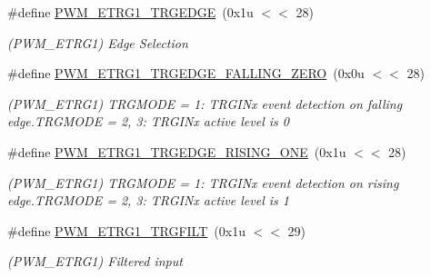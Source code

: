 \begin{DoxyCompactItemize}
\mbox{\label{group__SAME70__PWM_gaaf0120437d89414d59690742b3efa100}} 
\#define \mbox{\hyperlink{group__SAME70__PWM_gaaf0120437d89414d59690742b3efa100}{P\+W\+M\+\_\+\+E\+T\+R\+G1\+\_\+\+T\+R\+G\+E\+D\+GE}}~(0x1u $<$$<$ 28)
\begin{DoxyCompactList}\small\item\em (P\+W\+M\+\_\+\+E\+T\+R\+G1) Edge Selection \end{DoxyCompactList}\item 
\mbox{\label{group__SAME70__PWM_gac266df7e4f0b79f5bcb40bb827b592fb}} 
\#define \mbox{\hyperlink{group__SAME70__PWM_gac266df7e4f0b79f5bcb40bb827b592fb}{P\+W\+M\+\_\+\+E\+T\+R\+G1\+\_\+\+T\+R\+G\+E\+D\+G\+E\+\_\+\+F\+A\+L\+L\+I\+N\+G\+\_\+\+Z\+E\+RO}}~(0x0u $<$$<$ 28)
\begin{DoxyCompactList}\small\item\em (P\+W\+M\+\_\+\+E\+T\+R\+G1) T\+R\+G\+M\+O\+DE = 1\+: T\+R\+G\+I\+Nx event detection on falling edge.\+T\+R\+G\+M\+O\+DE = 2, 3\+: T\+R\+G\+I\+Nx active level is 0 \end{DoxyCompactList}\item 
\mbox{\label{group__SAME70__PWM_ga6b672d5ab66c44eda17f0224b2117447}} 
\#define \mbox{\hyperlink{group__SAME70__PWM_ga6b672d5ab66c44eda17f0224b2117447}{P\+W\+M\+\_\+\+E\+T\+R\+G1\+\_\+\+T\+R\+G\+E\+D\+G\+E\+\_\+\+R\+I\+S\+I\+N\+G\+\_\+\+O\+NE}}~(0x1u $<$$<$ 28)
\begin{DoxyCompactList}\small\item\em (P\+W\+M\+\_\+\+E\+T\+R\+G1) T\+R\+G\+M\+O\+DE = 1\+: T\+R\+G\+I\+Nx event detection on rising edge.\+T\+R\+G\+M\+O\+DE = 2, 3\+: T\+R\+G\+I\+Nx active level is 1 \end{DoxyCompactList}\item 
\mbox{\label{group__SAME70__PWM_ga31025a4e43c73075e8035dace5874ffa}} 
\#define \mbox{\hyperlink{group__SAME70__PWM_ga31025a4e43c73075e8035dace5874ffa}{P\+W\+M\+\_\+\+E\+T\+R\+G1\+\_\+\+T\+R\+G\+F\+I\+LT}}~(0x1u $<$$<$ 29)
\begin{DoxyCompactList}\small\item\em (P\+W\+M\+\_\+\+E\+T\+R\+G1) Filtered input \end{DoxyCompactList}\item 
\mbox{\label{group__SAME70__PWM_ga616ec21bb9207fdb750346ff7c510f20}} 

\end{DoxyCompactItemize}

